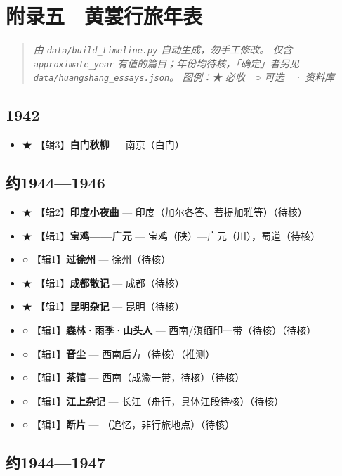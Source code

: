 \documentclass[UTF8,fontset=none,zihao=-4,a4paper]{ctexart}
\begin{document}
\section{附录五　黄裳行旅年表}

\begin{quote}\small\itshape
由 \texttt{data/build\_timeline.py} 自动生成，勿手工修改。 仅含 \texttt{approximate\_year} 有值的篇目；年份均待核，「确定」者另见 \texttt{data/huangshang\_essays.json}。 图例：★ 必收　○ 可选　· 资料库
\end{quote}

\subsection{1942}


\begin{itemize}
\item ★ 【辑3】\textbf{白门秋柳} — 南京（白门）
\end{itemize}


\subsection{约1944—1946}


\begin{itemize}
\item ★ 【辑2】\textbf{印度小夜曲} — 印度（加尔各答、菩提加雅等）（待核）
\item ★ 【辑1】\textbf{宝鸡——广元} — 宝鸡（陕）—广元（川），蜀道（待核）
\item ○ 【辑1】\textbf{过徐州} — 徐州（待核）
\item ★ 【辑1】\textbf{成都散记} — 成都（待核）
\item ★ 【辑1】\textbf{昆明杂记} — 昆明（待核）
\item ○ 【辑1】\textbf{森林·雨季·山头人} — 西南/滇缅印一带（待核）（待核）
\item ○ 【辑1】\textbf{音尘} — 西南后方（待核）（推测）
\item ○ 【辑1】\textbf{茶馆} — 西南（成渝一带，待核）（待核）
\item ○ 【辑1】\textbf{江上杂记} — 长江（舟行，具体江段待核）（待核）
\item ○ 【辑1】\textbf{断片} — （追忆，非行旅地点）（待核）
\end{itemize}


\subsection{约1944—1947}
\end{document}
